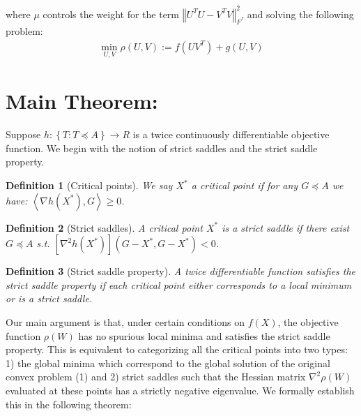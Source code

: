 \documentclass{article}
\newtheorem{definition}{Definition}
\begin{document}
where $\mu$ controls the weight for the term $\left\Vert U^TU-V^TV\right\Vert^2_F$, and solving the following problem:
\begin{align}
    {\min}_{U,V}\rho\left(U,V\right):=f\left(UV^T\right) + g\left(U,V\right)
\end{align}

\section{Main Theorem:}

Suppose $h:\left\{T: T\preceq A\right\}\rightarrow R$ is a twice continuously differentiable objective function. We begin with the notion of strict saddles and the strict saddle property.

\begin{definition}[Critical points]
We say $X^*$ a critical point if for any $G\preceq A$ we have: $\left<\nabla h\left(X^{*}\right),G\right>\ge0$.
\end{definition}

\begin{definition}[Strict saddles]
A critical point $X^*$ is a strict saddle if there exist $G\preceq A$ s.t. $\left[\nabla^2 h\left(X^*\right)\right]\left(G-X^*,G-X^*\right) < 0$.
\end{definition}

\begin{definition}[Strict saddle property]
A twice differentiable function satisfies the strict saddle property if each critical point either corresponds to a local minimum or is a strict saddle.
\end{definition}

Our main argument is that, under certain conditions on $f(X)$, the objective function $\rho(W)$ has no spurious local minima and satisfies the strict saddle property. This is equivalent to categorizing all the critical points into two types: 1) the global minima which correspond to the global solution of the original convex problem (1) and 2) strict saddles such that the Hessian matrix $\nabla^2\rho\left(W\right)$ evaluated at these points has a strictly negative eigenvalue. We formally establish this in the following theorem:
\end{document}
